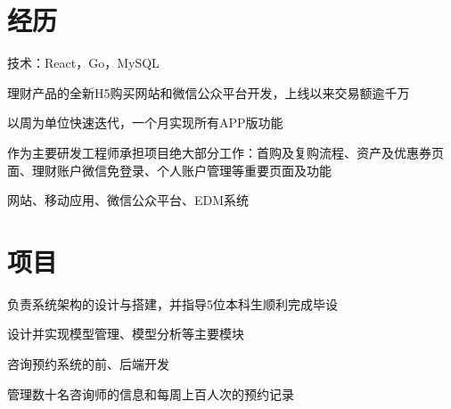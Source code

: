 \documentclass[]{resume_zh}
\begin{document}
\hfill
\begin{minipage}[t]{0.69\textwidth} 


\section{经历}
\vspace{\topsep} %
\begin{tightemize}
\item 技术：React，Go，MySQL
\item 理财产品的全新H5购买网站和微信公众平台开发，上线以来交易额逾千万
\item 以周为单位快速迭代，一个月实现所有APP版功能
\item 作为主要研发工程师承担项目绝大部分工作：首购及复购流程、资产及优惠券页面、理财账户微信免登录、个人账户管理等重要页面及功能
\end{tightemize}

\begin{tightemize}
\item 网站、移动应用、微信公众平台、EDM系统
\end{tightemize}



\section{项目}
\begin{tightemize}
\item 负责系统架构的设计与搭建，并指导5位本科生顺利完成毕设
\item 设计并实现模型管理、模型分析等主要模块
\end{tightemize}


\begin{tightemize}
\item 咨询预约系统的前、后端开发
\item 管理数十名咨询师的信息和每周上百人次的预约记录
\end{tightemize}


\end{minipage}
\end{document}
